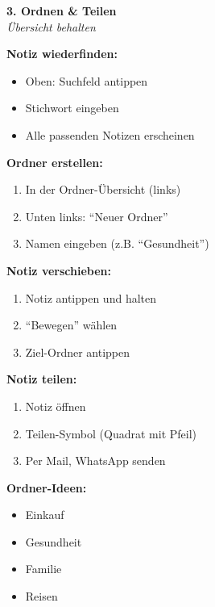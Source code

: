 \documentclass[a4paper,landscape,8pt]{extarticle}
\begin{document}
\hfill%
\begin{minipage}[t]{0.32\linewidth}
\begin{center}
\colorbox{sharegreen!10}{%
\begin{minipage}{0.95\linewidth}
\vspace{2mm}
\begin{center}
{\Large\bfseries\textcolor{sharegreen}{3. Ordnen \& Teilen}}\\[1pt]
{\footnotesize\itshape Übersicht behalten}
\end{center}
\vspace{2mm}
\end{minipage}%
}
\end{center}

\vspace{1mm}

\textbf{Notiz wiederfinden:}
\begin{itemize}
\item Oben: Suchfeld antippen
\item Stichwort eingeben
\item Alle passenden Notizen erscheinen
\end{itemize}

\textbf{Ordner erstellen:}
\begin{enumerate}
\item In der Ordner-Übersicht (links)
\item Unten links: ``Neuer Ordner''
\item Namen eingeben (z.B. ``Gesundheit'')
\end{enumerate}

\textbf{Notiz verschieben:}
\begin{enumerate}
\item Notiz antippen und halten
\item ``Bewegen'' wählen
\item Ziel-Ordner antippen
\end{enumerate}

\textbf{Notiz teilen:}
\begin{enumerate}
\item Notiz öffnen
\item Teilen-Symbol (Quadrat mit Pfeil)
\item Per Mail, WhatsApp senden
\end{enumerate}

\textbf{Ordner-Ideen:}
\begin{itemize}
\item Einkauf
\item Gesundheit
\item Familie
\item Reisen
\end{itemize}

\end{minipage}
\end{document}
